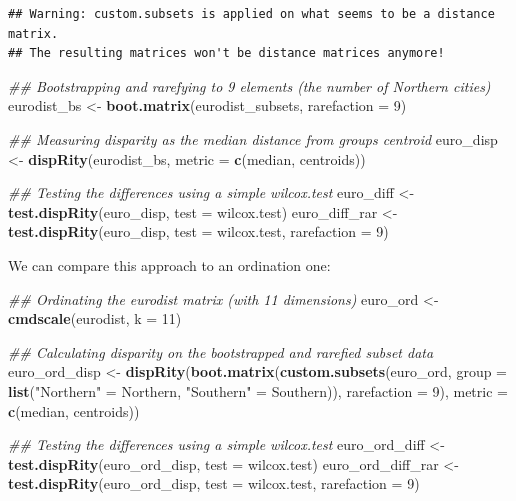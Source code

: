 \documentclass[
]{book}
\newenvironment{Shaded}{\begin{snugshade}}{\end{snugshade}}
\newcommand{\CommentTok}[1]{\textcolor[rgb]{0.56,0.35,0.01}{\textit{#1}}}
\newcommand{\DataTypeTok}[1]{\textcolor[rgb]{0.13,0.29,0.53}{#1}}
\newcommand{\DecValTok}[1]{\textcolor[rgb]{0.00,0.00,0.81}{#1}}
\newcommand{\KeywordTok}[1]{\textcolor[rgb]{0.13,0.29,0.53}{\textbf{#1}}}
\newcommand{\NormalTok}[1]{#1}
\newcommand{\StringTok}[1]{\textcolor[rgb]{0.31,0.60,0.02}{#1}}
\begin{document}
\begin{verbatim}
## Warning: custom.subsets is applied on what seems to be a distance matrix.
## The resulting matrices won't be distance matrices anymore!
\end{verbatim}

\begin{Shaded}
\begin{Highlighting}[]
\CommentTok{\#\# Bootstrapping and rarefying to 9 elements (the number of Northern cities)}
\NormalTok{eurodist\_bs \textless{}{-}}\StringTok{ }\KeywordTok{boot.matrix}\NormalTok{(eurodist\_subsets, }\DataTypeTok{rarefaction =} \DecValTok{9}\NormalTok{)}

\CommentTok{\#\# Measuring disparity as the median distance from group\textquotesingle{}s centroid}
\NormalTok{euro\_disp \textless{}{-}}\StringTok{ }\KeywordTok{dispRity}\NormalTok{(eurodist\_bs, }\DataTypeTok{metric =} \KeywordTok{c}\NormalTok{(median, centroids))}

\CommentTok{\#\# Testing the differences using a simple wilcox.test}
\NormalTok{euro\_diff \textless{}{-}}\StringTok{ }\KeywordTok{test.dispRity}\NormalTok{(euro\_disp, }\DataTypeTok{test =}\NormalTok{ wilcox.test)}
\NormalTok{euro\_diff\_rar \textless{}{-}}\StringTok{ }\KeywordTok{test.dispRity}\NormalTok{(euro\_disp, }\DataTypeTok{test =}\NormalTok{ wilcox.test, }\DataTypeTok{rarefaction =} \DecValTok{9}\NormalTok{)}
\end{Highlighting}
\end{Shaded}

We can compare this approach to an ordination one:

\begin{Shaded}
\begin{Highlighting}[]
\CommentTok{\#\# Ordinating the eurodist matrix (with 11 dimensions)}
\NormalTok{euro\_ord \textless{}{-}}\StringTok{ }\KeywordTok{cmdscale}\NormalTok{(eurodist, }\DataTypeTok{k =} \DecValTok{11}\NormalTok{)}

\CommentTok{\#\# Calculating disparity on the bootstrapped and rarefied subset data}
\NormalTok{euro\_ord\_disp \textless{}{-}}\StringTok{ }\KeywordTok{dispRity}\NormalTok{(}\KeywordTok{boot.matrix}\NormalTok{(}\KeywordTok{custom.subsets}\NormalTok{(euro\_ord, }\DataTypeTok{group =}
        \KeywordTok{list}\NormalTok{(}\StringTok{"Northern"}\NormalTok{ =}\StringTok{ }\NormalTok{Northern, }\StringTok{"Southern"}\NormalTok{ =}\StringTok{ }\NormalTok{Southern)), }\DataTypeTok{rarefaction =} \DecValTok{9}\NormalTok{),}
        \DataTypeTok{metric =} \KeywordTok{c}\NormalTok{(median, centroids))}

\CommentTok{\#\# Testing the differences using a simple wilcox.test}
\NormalTok{euro\_ord\_diff \textless{}{-}}\StringTok{ }\KeywordTok{test.dispRity}\NormalTok{(euro\_ord\_disp, }\DataTypeTok{test =}\NormalTok{ wilcox.test)}
\NormalTok{euro\_ord\_diff\_rar \textless{}{-}}\StringTok{ }\KeywordTok{test.dispRity}\NormalTok{(euro\_ord\_disp, }\DataTypeTok{test =}\NormalTok{ wilcox.test, }\DataTypeTok{rarefaction =} \DecValTok{9}\NormalTok{)}
\end{Highlighting}
\end{Shaded}
\end{document}
